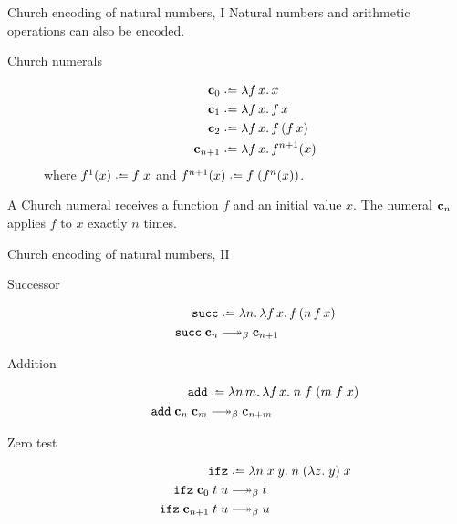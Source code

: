 \begin{frame}{Church encoding of natural numbers, I}
  Natural numbers and arithmetic operations can also be encoded.

  \begin{description}
    \item[Church numerals]
      \begin{align*}
        \bc_0     &\defeq \lambda f\,x.\,x \\
        \bc_1     &\defeq \lambda f\,x.\,f\,x \\
        \bc_2     &\defeq \lambda f\,x.\,f\,(f\,x) \\
        \bc_{n+1} &\defeq \lambda f\,x.\,f^{n+1}(x)
      \end{align*}
      where $f^1(x) \defeq f\;x$ and
      $f^{n+1}(x) \defeq f\;(f^n(x))$.
  \end{description}

  A Church numeral receives a function $f$ and an initial value $x$.
  The numeral $\mathbf{c}_n$ applies $f$ to $x$ exactly $n$ times.
\end{frame}


\begin{frame}{Church encoding of natural numbers, II}
  \begin{description}
    \item[Successor]
      \begin{align*}
        \mathtt{succ} &\defeq \lambda n.\,\lambda f\,x.\, f\,(n\,f\,x) \\
        \mathtt{succ}\;\bc_n &\reduce \bc_{n+1}
      \end{align*}

    \item[Addition]
      \begin{align*}
        \add &\defeq \lambda n\,m.\,\lambda f\,x.\;
          n\;f\;(m\;f\;x) \\
        \add\;\bc_n\;\bc_m &\reduce \bc_{n+m}
      \end{align*}

    \item[Zero test]
      \begin{align*}
        \ifz &\defeq \lambda n\;x\;y.\; n\;(\lambda z.\;y)\;x \\
        \ifz\;\bc_0\;t\;u &\reduce t \\
        \ifz\;\bc_{n+1}\;t\;u &\reduce u
      \end{align*}
  \end{description}
\end{frame}

